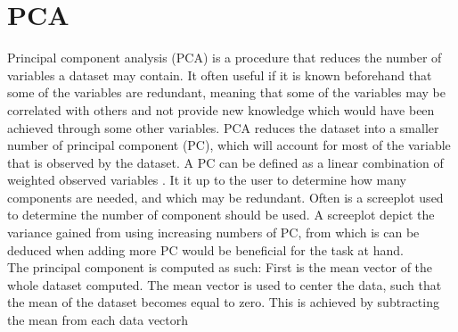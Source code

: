 \section{PCA}
Principal component analysis (PCA) is a procedure that reduces the number of 
variables a dataset may contain.  It often useful if it is known beforehand that 
some of the variables are redundant, meaning that some of the variables may be 
correlated with others and not provide new knowledge which would have been 
achieved through some other variables.  PCA reduces the dataset into a smaller 
number of principal component (PC), which will account for most of the variable 
that is observed by the dataset. A PC can be defined as a linear combination of 
weighted observed variables . It it up to the user to determine how many 
components are needed, and which may be redundant. Often is a screeplot used to 
determine the number of component should be used. A screeplot depict the 
variance gained from using increasing numbers of PC, from which is can be 
deduced when adding more PC would be beneficial for the task at hand. \\

The principal component is computed as such: 
First is the mean vector of the whole dataset computed. 
The mean vector is used to center the data, such that the mean of the dataset becomes equal to zero. This is achieved by subtracting the mean from each data vectorh 




